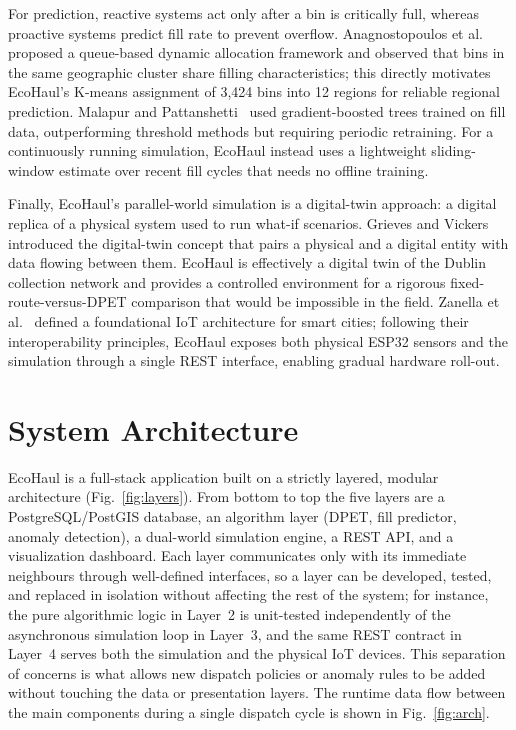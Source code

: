 \documentclass[conference, a4paper]{IEEEtran}
\begin{document}
For prediction, reactive systems act only after a bin is critically full, whereas proactive systems predict fill rate to prevent overflow. Anagnostopoulos et al.~\cite{anagnostopoulos2015} proposed a queue-based dynamic allocation framework and observed that bins in the same geographic cluster share filling characteristics; this directly motivates EcoHaul's K-means assignment of 3{,}424 bins into 12 regions for reliable regional prediction. Malapur and Pattanshetti~\cite{malapur2017} used gradient-boosted trees trained on fill data, outperforming threshold methods but requiring periodic retraining. For a continuously running simulation, EcoHaul instead uses a lightweight sliding-window estimate over recent fill cycles that needs no offline training.

Finally, EcoHaul's parallel-world simulation is a digital-twin approach: a digital replica of a physical system used to run what-if scenarios. Grieves and Vickers~\cite{grieves2017} introduced the digital-twin concept that pairs a physical and a digital entity with data flowing between them. EcoHaul is effectively a digital twin of the Dublin collection network and provides a controlled environment for a rigorous fixed-route-versus-DPET comparison that would be impossible in the field. Zanella et al.~\cite{zanella2014} defined a foundational IoT architecture for smart cities; following their interoperability principles, EcoHaul exposes both physical ESP32 sensors and the simulation through a single REST interface, enabling gradual hardware roll-out.

\section{System Architecture}
EcoHaul is a full-stack application built on a strictly layered, modular architecture (Fig.~\ref{fig:layers}). From bottom to top the five layers are a PostgreSQL/PostGIS database, an algorithm layer (DPET, fill predictor, anomaly detection), a dual-world simulation engine, a REST API, and a visualization dashboard. Each layer communicates only with its immediate neighbours through well-defined interfaces, so a layer can be developed, tested, and replaced in isolation without affecting the rest of the system; for instance, the pure algorithmic logic in Layer~2 is unit-tested independently of the asynchronous simulation loop in Layer~3, and the same REST contract in Layer~4 serves both the simulation and the physical IoT devices. This separation of concerns is what allows new dispatch policies or anomaly rules to be added without touching the data or presentation layers. The runtime data flow between the main components during a single dispatch cycle is shown in Fig.~\ref{fig:arch}.
\end{document}
